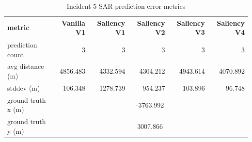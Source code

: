 \begin{table}[ht]
\centering
\caption{Incident 5 SAR prediction error metrics}
\label{tab:sar-incident-5}
\begin{tabular}{lrrrrr}
\hline
metric & Vanilla V1 & Saliency V1 & Saliency V2 & Saliency V3 & Saliency V4 \\
\hline
prediction count & 3 & 3 & 3 & 3 & 3 \\
avg distance (m) & 4856.483 & 4332.594 & 4304.212 & 4943.614 & 4070.892 \\
stddev (m) & 106.348 & 1278.739 & 954.237 & 103.896 & 96.748 \\
ground truth x (m) & \multicolumn{5}{c}{-3763.992} \\
ground truth y (m) & \multicolumn{5}{c}{3007.866} \\
\hline
\end{tabular}
\end{table}
